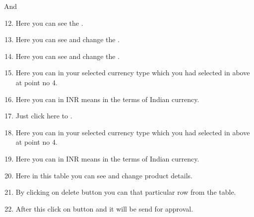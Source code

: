 \documentclass[letterpaper,10pt,english]{sphinxmanual}
\begin{document}
\begin{figure}[htbp]
\centering

\noindent{}
\end{figure}

And
\begin{enumerate}
\setcounter{enumi}{11}
\item {} 
Here you can see the  .

\item {} 
Here you can see and change the  .

\item {} 
Here you can see and change the  .

\item {} 
Here you can  in your selected currency type which you had selected in above at point no 4.

\item {} 
Here you can  in INR means in the terms of Indian currency.

\item {} 
Just click here to  .

\item {} 
Here you can  in your selected currency type which you had selected in above at point no 4.

\item {} 
Here you can  in INR means in the terms of Indian currency.

\item {} 
Here in this table you can see and change product details.

\item {} 
By clicking on delete button you can  that particular row from the table.

\item {} 
After this click on  button and it will be send for approval.

\end{enumerate}

\begin{figure}[htbp]
\centering

\noindent{}
\end{figure}
\end{document}
